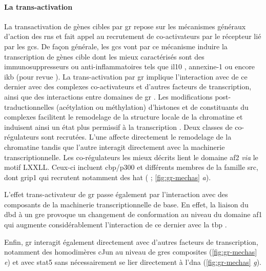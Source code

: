 \documentclass[../main.tex]{subfiles}
\begin{document}
\paragraph{La trans-activation}
La transactivation de gènes cibles par \gls{gr} repose sur les mécanismes généraux d'action des \glspl{rn} et fait appel au recrutement de co-activateurs par le récepteur lié par les \glspl{gc}.
De façon générale, les \glspl{gc} vont par ce mécanisme induire la transcription de gènes cible dont les mieux caractérisés sont des immunosuppresseurs ou anti-inflammatoires tels que \gls{il10} \citep{Mozo2004}, annexine-1 \citep{Philip1993} ou encore \gls{ikb} \citep{Auphan1995} (pour revue \citealp{Newton2000}).
La trans-activation par \gls{gr} implique l'interaction avec de ce dernier avec des complexes co-activateurs et d'autres facteurs de transcription, ainsi que des interactions entre domaines de \gls{gr} \citep{Bledsoe2002,Kumar2005}.
Les modifications post-traductionnelles (acétylation ou méthylation) d'histones et de constituants du complexes facilitent le remodelage de la structure locale de la chromatine et induisent ainsi un état plus permissif à la transcription \citep{Aranda2001}.
Deux classes de co-régulateurs sont recrutées.
L'une affecte directement le remodelage de la chromatine tandis que l'autre interagit directement avec la machinerie transcriptionnelle.
Les co-régulateurs les mieux décrits lient le domaine \gls{af2} \textit{via} le motif LXXLL.
Ceux-ci incluent \gls{cbp}/p300 et différents membres de la famille \gls{src}, dont \gls{grip1} qui recrutent notamment des \gls{hat} (\citep{Fryer1998} ; \autoref{fig:gr-mechas} \textit{a}).



L'effet trans-activateur de \gls{gr} passe également par l'interaction avec des composants de la machinerie transcriptionnelle de base.
En effet, la liaison du \gls{dbd} à un \gls{gre} provoque un changement de conformation au niveau du domaine \gls{af1} qui augmente considérablement l'interaction de ce dernier avec la \gls{tbp} \citep{Kumar2004}.
\par
Enfin, \gls{gr} interagit également directement avec d'autres facteurs de transcription, notamment des homodimères cJun au niveau de \glspl{gre} composites (\autoref{fig:gr-mechas} \textit{e}) et avec \gls{stat5} \citep{Stoecklin1997} sans nécessairement se lier directement à l'\gls{dna} (\autoref{fig:gr-mechas} \textit{g}).
\end{document}
